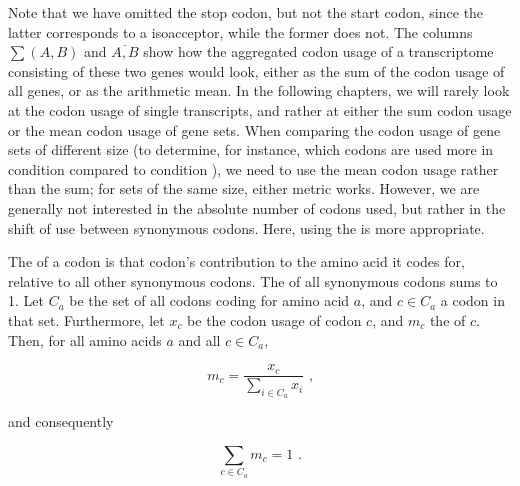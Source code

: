 Note that we have omitted the stop codon, but not the start codon, since the
latter corresponds to a \trna isoacceptor, while the former does not. The
columns \(\sum(A,B)\) and \(\overline{A,B}\) show how the aggregated codon usage
of a transcriptome consisting of these two genes would look, either as the sum
of the codon usage of all genes, or as the arithmetic mean. In the following
chapters, we will rarely look at the codon usage of single transcripts, and
rather at either the sum codon usage or the mean codon usage of gene sets. When
comparing the codon usage of gene sets of different size (to determine, for
instance, which codons are used more in condition  compared to
condition ), we need to use the mean codon usage rather than the sum;
for sets of the same size, either metric works. However, we are generally not
interested in the absolute number of codons used, but rather in the shift of use
between synonymous codons. Here, using the \rcu is more appropriate.

The  of a codon is that codon’s
contribution to the amino acid it codes for, relative to all other synonymous
codons. The \rcu of all synonymous codons sums to \num{1}. Let \(C_a\) be the
set of all codons coding for amino acid \(a\), and \(c \in C_a\) a codon in that
set. Furthermore, let \(x_c\) be the codon usage of codon \(c\), and \(m_c\) the
\rcu of \(c\). Then, for all amino acids \(a\) and all \(c \in C_a\),

\begin{equation}
    m_c = \frac{x_c}{\sum_{i \in C_a} x_i} \text{\ ,}
\end{equation}

and consequently

\begin{equation}
    \sum_{c \in C_a} m_c = 1 \text{\ .}
\end{equation}

